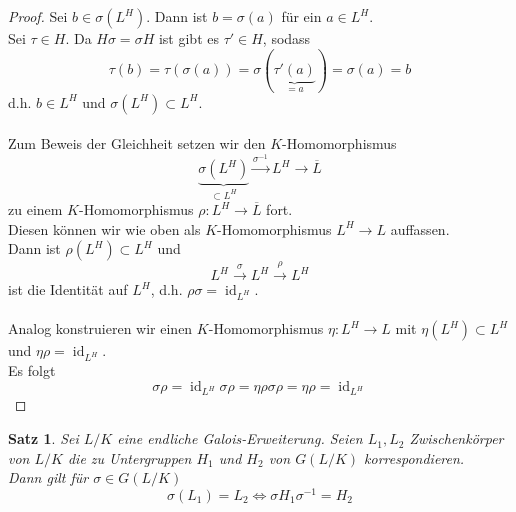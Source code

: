 \documentclass[10pt,a4paper]{article}
\newcommand{\ol}[1]{\overline{#1}}
\newcommand{\id}{\operatorname{id}}
\theoremstyle{plain}
\newtheorem{satz}[theorem]{Satz}
\theoremstyle{definition}
\theoremstyle{remark}
\begin{document}
\begin{proof}
		Sei $b\in\sigma(L^H)$. Dann ist $b=\sigma(a)$ für ein $a\in L^H$.\\
		Sei $\tau\in H$. Da $H\sigma=\sigma H$ ist gibt es $\tau'\in H$, sodass
		\[\tau(b)=\tau(\sigma(a))=\sigma(\underbrace{\tau'(a)}_{=a})=\sigma(a)=b\]
		d.h. $b\in L^H$ und $\sigma(L^H)\subset L^H$.\\
		\\
		Zum Beweis der Gleichheit setzen wir den $K$-Homomorphismus
		\[\underbrace{\sigma(L^H)}_{\subset L^H}\xrightarrow{\sigma^{-1}}L^H\to\ol L\]
		zu einem $K$-Homomorphismus $\rho:L^H\to\ol L$ fort.\\
		Diesen können wir wie oben als $K$-Homomorphismus $L^H\to L$ auffassen.\\
		Dann ist $\rho(L^H)\subset L^H$ und
		\[L^H\xrightarrow{\sigma}L^H\xrightarrow{\rho}L^H\]
		ist die Identität auf $L^H$, d.h. $\rho\sigma=\id_{L^H}$.\\
		\\
		Analog konstruieren wir einen $K$-Homomorphismus $\eta:L^H\to L$ mit $\eta(L^H)\subset L^H$ und $\eta\rho=\id_{L^H}$.\\
		Es folgt
		\[\sigma\rho=\id_{L^H}\sigma\rho=\eta\rho\sigma\rho=\eta\rho=\id_{L^H}\]
	\end{proof}

	\begin{satz}
		Sei $L/K$ eine endliche Galois-Erweiterung. Seien $L_1,L_2$ Zwischenkörper von $L/K$ die zu Untergruppen $H_1$ und $H_2$ von $G(L/K)$ korrespondieren.\\
		Dann gilt für $\sigma\in G(L/K)$
		\[\sigma(L_1)=L_2\Leftrightarrow\sigma H_1\sigma^{-1}=H_2\]
	\end{satz}
\end{document}
